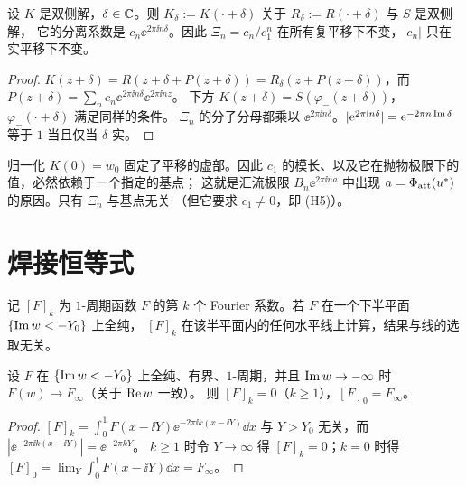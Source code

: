 \begin{proposition}[平移规范]\label{ch5:prop:gauge}
设 $K$ 是双侧解，$\delta\in\mathbb{C}$。则 $K_\delta:=K(\cdot+\delta)$ 关于 $R_\delta:=R(\cdot+\delta)$ 与 $S$ 是双侧解，
它的分离系数是 $c_n\ee^{2\pi\ii n\delta}$。因此 $\Xi_n=c_n/c_1^n$ 在所有复平移下不变，$|c_n|$ 只在实平移下不变。
\end{proposition}

\begin{proof}
$K(z+\delta)=R(z+\delta+P(z+\delta))=R_\delta(z+P(z+\delta))$，而 $P(z+\delta)=\sum_nc_n\ee^{2\pi\ii n\delta}\ee^{2\pi\ii nz}$。
下方 $K(z+\delta)=S(\varphi_-(z+\delta))$，$\varphi_-(\cdot+\delta)$ 满足同样的条件。
$\Xi_n$ 的分子分母都乘以 $\ee^{2\pi\ii n\delta}$。$|\mathrm{e}^{2\pi\mathrm{i} n\delta}|=\mathrm{e}^{-2\pi n\operatorname{Im}\delta}$ 等于 $1$ 当且仅当 $\delta$ 实。
\end{proof}

\begin{remark}[为什么需要基点]\label{ch5:rem:need-base}
归一化 $K(0)=w_0$ 固定了平移的虚部。因此 $c_1$ 的模长、以及它在抛物极限下的值，必然依赖于一个指定的基点；
这就是汇流极限 $B_n\ee^{2\pi\ii na}$ 中出现 $a=\Phi_{\mathrm{att}}(u^{*})$ 的原因。只有 $\Xi_n$ 与基点无关
（但它要求 $c_1\ne0$，即 (H5)）。
\end{remark}

\section{焊接恒等式}\label{ch5:sec:welding}

记 $[F]_k$ 为 $1$-周期函数 $F$ 的第 $k$ 个 Fourier 系数。若 $F$ 在一个下半平面 $\{\operatorname{Im} w<-Y_0\}$ 上全纯，
$[F]_k$ 在该半平面内的任何水平线上计算，结果与线的选取无关。

\begin{lemma}\label{ch5:lem:lower-modes}
设 $F$ 在 $\{\operatorname{Im} w<-Y_0\}$ 上全纯、有界、$1$-周期，并且 $\operatorname{Im} w\to-\infty$ 时 $F(w)\to F_\infty$（关于 $\operatorname{Re} w$ 一致）。
则 $[F]_k=0$（$k\ge1$），$[F]_0=F_\infty$。
\end{lemma}

\begin{proof}
$[F]_k=\int_0^1F(x-\ii Y)\ee^{-2\pi\ii k(x-\ii Y)}\dd x$ 与 $Y>Y_0$ 无关，而 $|\ee^{-2\pi\ii k(x-\ii Y)}|=\ee^{-2\pi kY}$。
$k\ge1$ 时令 $Y\to\infty$ 得 $[F]_k=0$；$k=0$ 时得 $[F]_0=\lim_Y\int_0^1F(x-\ii Y)\dd x=F_\infty$。
\end{proof}

